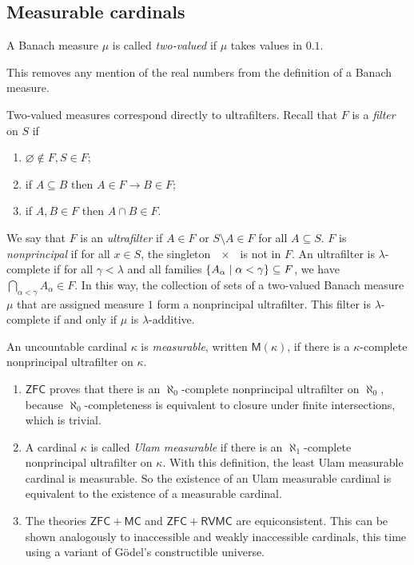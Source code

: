 \subsection{Measurable cardinals}
\begin{definition}
    A Banach measure \( \mu \) is called \emph{two-valued} if \( \mu \) takes values in \( \qty{0,1} \).
\end{definition}
This removes any mention of the real numbers from the definition of a Banach measure.
\begin{remark}
    Two-valued measures correspond directly to ultrafilters.
    Recall that \( F \) is a \emph{filter} on \( S \) if
    \begin{enumerate}
        \item \( \varnothing \notin F, S \in F \);
        \item if \( A \subseteq B \) then \( A \in F \to B \in F \);
        \item if \( A, B \in F \) then \( A \cap B \in F \).
    \end{enumerate}
    We say that \( F \) is an \emph{ultrafilter} if \( A \in F \) or \( S \setminus A \in F \) for all \( A \subseteq S \).
    \( F \) is \emph{nonprincipal} if for all \( x \in S \), the singleton \( \qty{x} \) is not in \( F \).
    An ultrafilter is \( \lambda \)-complete if for all \( \gamma < \lambda \) and all families \( \qty{A_\alpha \mid \alpha < \gamma} \subseteq F \), we have \( \bigcap_{\alpha < \gamma} A_\alpha \in F \).
    In this way, the collection of sets of a two-valued Banach measure \( \mu \) that are assigned measure \( 1 \) form a nonprincipal ultrafilter.
    This filter is \( \lambda \)-complete if and only if \( \mu \) is \( \lambda \)-additive.
\end{remark}
\begin{definition}
    An uncountable cardinal \( \kappa \) is \emph{measurable}, written \( \mathsf{M}(\kappa) \), if there is a \( \kappa \)-complete nonprincipal ultrafilter on \( \kappa \).
\end{definition}
\begin{remark}
    \begin{enumerate}
        \item \( \mathsf{ZFC} \) proves that there is an \( \aleph_0 \)-complete nonprincipal ultrafilter on \( \aleph_0 \), because \( \aleph_0 \)-completeness is equivalent to closure under finite intersections, which is trivial.
        \item A cardinal \( \kappa \) is called \emph{Ulam measurable} if there is an \( \aleph_1 \)-complete nonprincipal ultrafilter on \( \kappa \).
        With this definition, the least Ulam measurable cardinal is measurable.
        So the existence of an Ulam measurable cardinal is equivalent to the existence of a measurable cardinal.
        \item The theories \( \mathsf{ZFC} + \mathsf{MC} \) and \( \mathsf{ZFC} + \mathsf{RVMC} \) are equiconsistent.
        This can be shown analogously to inaccessible and weakly inaccessible cardinals, this time using a variant of G\"odel's constructible universe.
    \end{enumerate}
\end{remark}
